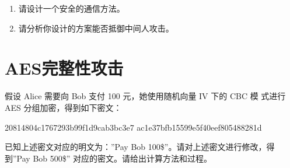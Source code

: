 \begin{enumerate}
    \item 请设计一个安全的通信方法。
    \item 请分析你设计的方案能否抵御中间人攻击。
\end{enumerate}

\begin{Solution}
\end{Solution}

\section{AES完整性攻击}

假设 Alice 需要向 Bob 支付 100 元，她使用随机向量 IV 下的 CBC 模
式进行 AES 分组加密，得到如下密文：

\begin{center}
    20814804c1767293b99f1d9cab3bc3e7 ac1e37bfb15599e5f40eef805488281d
\end{center}
已知上述密文对应的明文为：”Pay Bob 100\$”。请对上述密文进行修改，得
到”Pay Bob 500\$” 对应的密文。请给出计算方法和过程。

\begin{Solution}
\end{Solution}